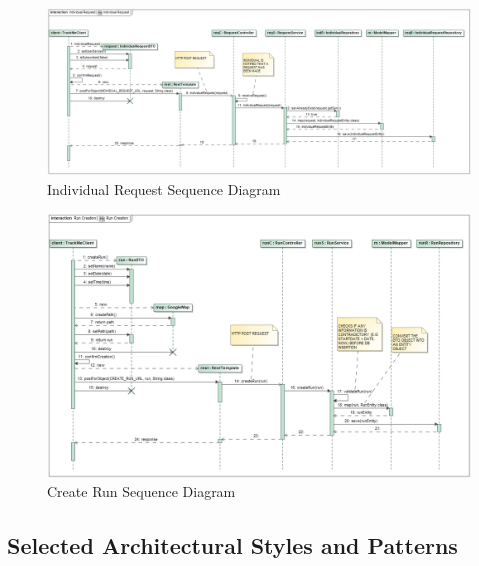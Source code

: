 \documentclass[a4paper]{article}
\begin{document}
\begin{figure}[!htpb]
    \centering
    \advance\leftskip-3cm
    \includegraphics[width=1.5\textwidth,keepaspectratio]{DD/images/UML/sequence_individualRequest.jpg}
    \caption{Individual Request Sequence Diagram}
    \label{fig:sequence_individualrequest}
\end{figure} 
\begin{figure}[!htpb]
    \centering
    \advance\leftskip-3cm
    \includegraphics[width=1.5\textwidth,keepaspectratio]{DD/images/UML/sequence_runCreation.jpg}
    \caption{Create Run Sequence Diagram}
    \label{fig:sequence_createrun}
\end{figure}

\newpage
\subsection{Selected Architectural Styles and Patterns}
\end{document}
